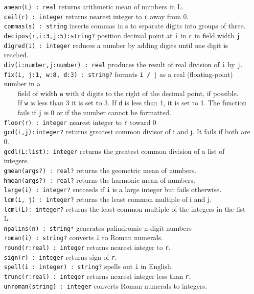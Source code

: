 \texttt{amean(L) : real} returns arithmetic mean of
numbers in L.\\
\texttt{ceil(r) : integer} returns nearest integer to
\texttt{r} away from 0.\\
\texttt{commas(s) : string} inserts commas in s to separate digits into
groups of three.\\
\texttt{decipos(r,i:3,j:5):string?} position decimal point at \texttt{i}
in \texttt{r} in field width \texttt{j}.\\
\texttt{digred(i) : integer} reduces a number by adding digits until one
digit is reached.\\
\texttt{div(i:number,j:number) : real} produces the result of real
division of \texttt{i} by \texttt{j}.\\
\texttt{fix(i, j:1, w:8, d:3) : string?} formats \texttt{i / j} as a
real (floating-point) number in a\\
 \ \ \ \ field of width \texttt{w} with \texttt{d} digits to
the right of the decimal point, if possible.\\
 \ \ \ \ If \texttt{w} is less than 3 it is set to 3. If \texttt{d} is
less than 1, it is set to 1. The function\\
 \ \ \ \  fails if \texttt{j}
is 0 or if the number cannot be formatted.\\
\texttt{floor(r)}\texttt{ : integer} nearest integer to
\texttt{r} toward 0\\
\texttt{gcd(i,j):integer?} returns greatest common divisor of i and j.
It fails if both are 0.\\
\texttt{gcdl(L:list): integer} returns the greatest common division of a
list of integers.\\
\texttt{gmean(args?) : real?} returns the geometric mean of
numbers.\\
\texttt{hmean(args?) : real?} returns the harmonic mean of
numbers.\\
\texttt{large(i) : integer?} succeeds if \texttt{i} is a large integer
but fails otherwise.\\
\texttt{lcm(i, j) : integer?} returns the least common multiple of i and
j.\\
\texttt{lcml(L): integer?} returns the least common multiple of the
integers in the list L.\\
\texttt{npalins(n) : string*} generates palindromic n-digit
numbers\\
\texttt{roman(i) : string?} converts \texttt{i} to Roman numerals.\\
\texttt{round(r:real) : integer} returns nearest integer to
\texttt{r}.\\
\texttt{sign(r) : integer} returns sign of \texttt{r}.\\
\texttt{spell(i : integer) : string?} spells out \texttt{i} in
English.\\
\texttt{trunc(r:real) : integer} returns nearest integer less than
\texttt{r}.\\
\texttt{unroman(string) : integer} converts Roman numerals to integers.

